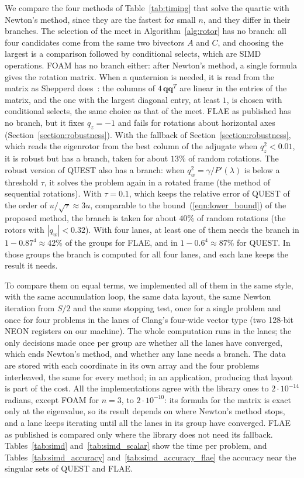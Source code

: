 \documentclass{birkjour}
\theoremstyle{definition}
\theoremstyle{remark}
\numberwithin{equation}{section}
\begin{document}
We compare the four methods of Table~\ref{tab:timing} that solve the quartic with Newton's method, since they are the fastest for small $n$, and they differ in their branches. The selection of the meet in Algorithm~\ref{alg:rotor} has no branch: all four candidates come from the same two bivectors $A$ and $C$, and choosing the largest is a comparison followed by conditional selects, which are SIMD operations. FOAM has no branch either: after Newton's method, a single formula gives the rotation matrix. When a quaternion is needed, it is read from the matrix as Shepperd does~\cite{Shepperd1978}: the columns of $4\,\mathbf{q}\mathbf{q}^T$ are linear in the entries of the matrix, and the one with the largest diagonal entry, at least $1$, is chosen with conditional selects, the same choice as that of the meet. FLAE as published has no branch, but it fixes $q_z = -1$ and fails for rotations about horizontal axes (Section~\ref{section:robustness}). With the fallback of Section~\ref{section:robustness}, which reads the eigenrotor from the best column of the adjugate when $q_z^2 < 0.01$, it is robust but has a branch, taken for about $13\%$ of random rotations. The robust version of QUEST also has a branch: when $q_w^2 = \gamma / P'(\lambda)$ is below a threshold $\tau$, it solves the problem again in a rotated frame (the method of sequential rotations). With $\tau = 0.1$, which keeps the relative error of QUEST of the order of $u / \sqrt{\tau} \approx 3u$, comparable to the bound~(\ref{eqn:lower_bound}) of the proposed method, the branch is taken for about $40\%$ of random rotations (the rotors with $|q_w| < 0.32$). With four lanes, at least one of them needs the branch in $1 - 0.87^4 \approx 42\%$ of the groups for FLAE, and in $1 - 0.6^4 \approx 87\%$ for QUEST. In those groups the branch is computed for all four lanes, and each lane keeps the result it needs.

To compare them on equal terms, we implemented all of them in the same style, with the same accumulation loop, the same data layout, the same Newton iteration from $S/2$ and the same stopping test, once for a single problem and once for four problems in the lanes of Clang's four-wide vector type (two 128-bit NEON registers on our machine). The whole computation runs in the lanes; the only decisions made once per group are whether all the lanes have converged, which ends Newton's method, and whether any lane needs a branch. The data are stored with each coordinate in its own array and the four problems interleaved, the same for every method; in an application, producing that layout is part of the cost. All the implementations agree with the library ones to $2 \cdot 10^{-14}$ radians, except FOAM for $n = 3$, to $2 \cdot 10^{-10}$: its formula for the matrix is exact only at the eigenvalue, so its result depends on where Newton's method stops, and a lane keeps iterating until all the lanes in its group have converged. FLAE as published is compared only where the library does not need its fallback. Tables~\ref{tab:simd} and~\ref{tab:simd_scalar} show the time per problem, and Tables~\ref{tab:simd_accuracy} and~\ref{tab:simd_accuracy_flae} the accuracy near the singular sets of QUEST and FLAE.
\end{document}
